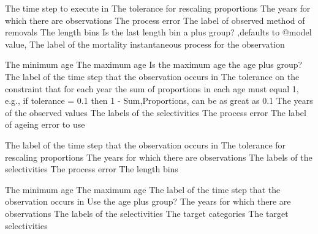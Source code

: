 \par\textbf{}\par
{} {The time step to execute in}
 {The tolerance for rescaling proportions}
 {The years for which there are observations}
 {The process error}
 {The label of observed method of removals}
 {The length bins}
 {Is the last length bin a plus group? ,defaults to @model value,}
 {The label of the mortality instantaneous process for the observation}
\par\textbf{}\par
{} {The minimum age}
 {The maximum age}
 {Is the maximum age the age plus group?}
 {The label of the time step that the observation occurs in}
 {The tolerance on the constraint that for each year the sum of proportions in each age must equal 1, e.g., if tolerance = 0.1 then 1 - Sum,Proportions, can be as great as 0.1}
 {The years of the observed values}
 {The labels of the selectivities}
 {The process error}
 {The label of ageing error to use}
\par\textbf{}\par
{} {The label of the time step that the observation occurs in}
 {The tolerance for rescaling proportions}
 {The years for which there are observations}
 {The labels of the selectivities}
 {The process error}
 {The length bins}
\par\textbf{}\par
{} {The minimum age}
 {The maximum age}
 {The label of the time step that the observation occurs in}
 {Use the age plus group?}
 {The years for which there are observations}
 {The labels of the selectivities}
 {The target categories}
 {The target selectivities}
\par\textbf{}\par
